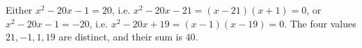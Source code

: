 Either $x^2-20x-1=20$, i.e. $x^2-20x-21=(x-21)(x+1)=0$, or $x^2-20x-1=-20$, i.e. $x^2-20x+19=(x-1)(x-19)=0$. The four values $21,-1,1,19$ are distinct, and their sum is $\boxed{40}$.
